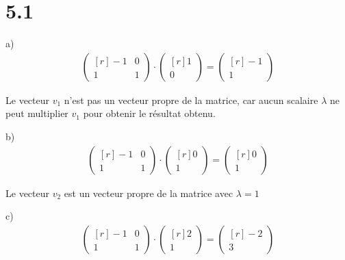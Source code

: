 \section*{5.1}

a) 
\begin{align*}
   \begin{pmatrix*}[r] 
   -1 & 0 \\
    1 & 1
   \end{pmatrix*}
   \cdot
   \begin{pmatrix*}[r] 
   1 \\
   0
   \end{pmatrix*}
   =
   \begin{pmatrix*}[r] 
   -1 \\
    1
   \end{pmatrix*}
\end{align*}

Le vecteur $v_1$ n'est pas un vecteur propre de la matrice, car aucun scalaire
$\lambda$ ne peut multiplier $v_1$ pour obtenir le résultat obtenu.

b) 
\begin{align*}
   \begin{pmatrix*}[r] 
   -1 & 0 \\
    1 & 1
   \end{pmatrix*}
   \cdot
   \begin{pmatrix*}[r] 
   0 \\
   1
   \end{pmatrix*}
   =
   \begin{pmatrix*}[r] 
   0 \\
   1 
   \end{pmatrix*}
\end{align*}

Le vecteur $v_2$ est un vecteur propre de la matrice avec $\lambda = 1$

c) 
\begin{align*}
   \begin{pmatrix*}[r] 
   -1 & 0 \\
    1 & 1
   \end{pmatrix*}
   \cdot
   \begin{pmatrix*}[r] 
   2 \\
   1
   \end{pmatrix*}
   =
   \begin{pmatrix*}[r] 
   -2 \\
    3 
   \end{pmatrix*}
\end{align*}

